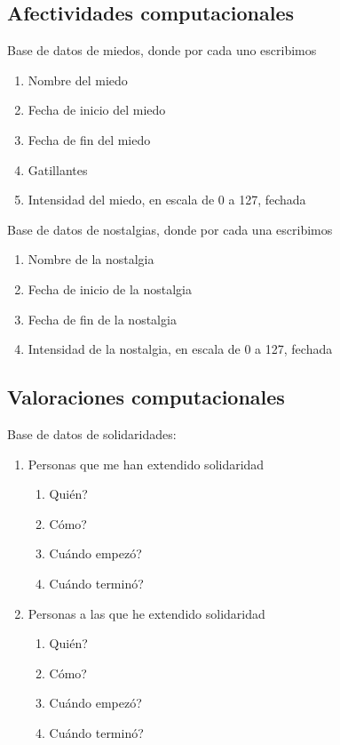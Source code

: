 \documentclass[./informes.tex]{subfiles}
\begin{document}
\subsection{Afectividades computacionales}

Base de datos de miedos, donde por cada uno escribimos

\begin{enumerate}
  \item Nombre del miedo
  \item Fecha de inicio del miedo
  \item Fecha de fin del miedo
  \item Gatillantes
  \item Intensidad del miedo, en escala de 0 a 127, fechada
\end{enumerate}

Base de datos de nostalgias, donde por cada una escribimos

\begin{enumerate}
  \item Nombre de la nostalgia
  \item Fecha de inicio de la nostalgia
  \item Fecha de fin de la nostalgia
  \item Intensidad de la nostalgia, en escala de 0 a 127, fechada
\end{enumerate}

\subsection{Valoraciones computacionales}

Base de datos de solidaridades:

\begin{enumerate}
  \item Personas que me han extendido solidaridad
    \begin{enumerate}
      \item Quién?
      \item Cómo?
      \item Cuándo empezó?
      \item Cuándo terminó?
    \end{enumerate}
  \item Personas a las que he extendido solidaridad
    \begin{enumerate}
      \item Quién?
      \item Cómo?
      \item Cuándo empezó?
      \item Cuándo terminó?
    \end{enumerate}
\end{enumerate}
\end{document}
